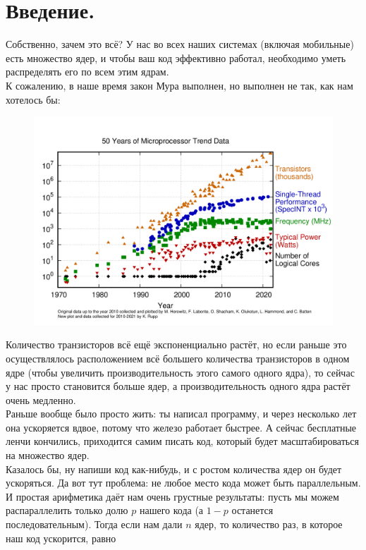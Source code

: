 \documentclass{article}
\begin{document}
\section{Введение.}
Собственно, зачем это всё? У нас во всех наших системах (включая мобильные) есть множество ядер, и чтобы ваш код эффективно работал, необходимо уметь распределять его по всем этим ядрам.\\
К сожалению, в наше время закон Мура выполнен, но выполнен не так, как нам хотелось бы:
\begin{figure}[H]
    \label{fig:50-years-of-microprocessor-trend-data}
    \includegraphics[scale=0.33]{"Images/50 Years of Microprocessor Trend Data"}
\end{figure}
Количество транзисторов всё ещё экспоненциально растёт, но если раньше это осуществлялось расположением всё большего количества транзисторов в одном ядре (чтобы увеличить производительность этого самого одного ядра), то сейчас у нас просто становится больше ядер, а производительность одного ядра растёт очень медленно.\\
Раньше вообще было просто жить: ты написал программу, и через несколько лет она ускоряется вдвое, потому что железо работает быстрее. А сейчас бесплатные ленчи кончились, приходится самим писать код, который будет масштабироваться на множество ядер.\\
Казалось бы, ну напиши код как-нибудь, и с ростом количества ядер он будет ускоряться. Да вот тут проблема: не любое место кода может быть параллельным. И простая арифметика даёт нам очень грустные результаты: пусть мы можем распараллелить только долю $p$ нашего кода (а $1-p$ останется последовательным). Тогда если нам дали $n$ ядер, то количество раз, в которое наш код ускорится, равно
\end{document}
